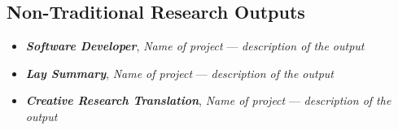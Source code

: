 \subsection{Non-Traditional Research Outputs}
\begin{itemize}
 \item \textbf{\textit{Software Developer}}, \textit{Name of project} --- \textit{description of the output}
 \item \textbf{\textit{Lay Summary}}, \textit{Name of project} --- \textit{description of the output}
 \item \textbf{\textit{Creative Research Translation}}, \textit{Name of project} --- \textit{description of the output}
\end{itemize}
